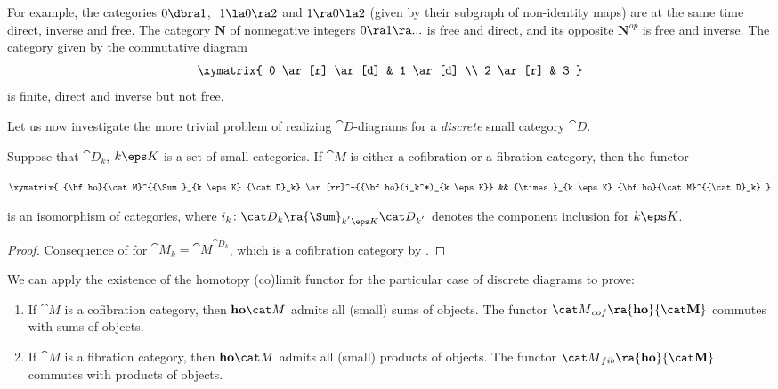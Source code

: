 For example, the categories $0 \dbra 1$, $\,\,1 \la 0 \ra 2$ and $1 \ra 0 \la 2$ (given by their subgraph of non-identity maps) are at the same time direct, inverse and free. The category $\mathbf{N}$ of nonnegative integers $0 \ra 1 \ra ...$ is free and direct, and its opposite $\mathbf{N}^{op}$ is free and inverse. The category given by the commutative diagram
\[
\xymatrix{
  0 \ar[r] \ar[d] & 1 \ar[d] \\
  2 \ar[r] & 3
}
\]
is finite, direct and inverse but not free.

Let us now investigate the more trivial problem of realizing ${\cat D}$-diagrams for a {\it discrete} small category ${\cat D}$.

\begin{lem}
\label{lem:cofcatsumsofdiagrams}
Suppose that ${\cat D}_k$, $k \eps K$ is a set of small categories. If ${\cat M}$ is either a cofibration or a fibration category, then the functor
\begin{center}
$\xymatrix {
    {\bf ho}{\cat M}^{{\Sum}_{k \eps K} {\cat D}_k}
    \ar[rr]^-{{\bf ho}(i_k^*)_{k \eps K}} &&
    {\times}_{k \eps K} {\bf ho}{\cat M}^{{\cat D}_k}
  }$
\end{center}
is an isomorphism of categories, where $i_{k} \colon {\cat D}_{k} \ra {\Sum}_{k^{'} \eps K} {\cat D}_{k^{'}}$ denotes the component inclusion for $k \eps K$.
\end{lem}

\begin{proof}
Consequence of  for ${\cat M}_k = {\cat M}^{{\cat D}_k}$, which is a cofibration category by .
\end{proof}

We can apply the existence of the homotopy (co)limit functor for the particular case of discrete diagrams to prove:

\begin{lem}
\label{lem:cofcathomotopysum}
\mbox{}
\begin{enumerate}
\item
If ${\cat M}$ is a cofibration category, then ${\bf ho}{\cat M}$ admits all (small) sums of objects. The functor ${\cat M}_{cof} \ra {\bf ho}{\cat M}$ commutes with sums of objects.
\item
If ${\cat M}$ is a fibration category, then ${\bf ho}{\cat M}$ admits all (small) products of objects. The functor ${\cat M}_{fib} \ra {\bf ho}{\cat M}$ commutes with products of objects.
\end{enumerate}
\end{lem}

